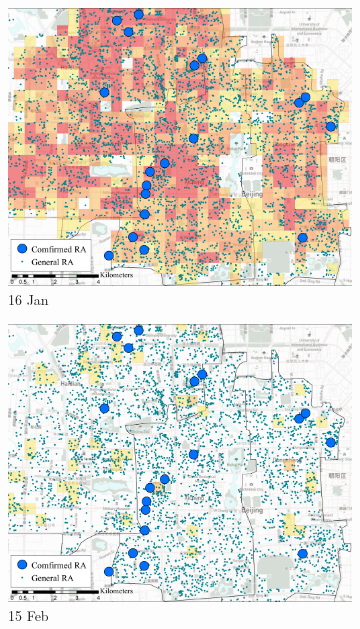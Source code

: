 \documentclass[preprints,ijgi,submit,moreauthors]{Definitions/mdpi}
\begin{document}
\begin{figure}[H]
    \centering
    \begin{subfigure}{.32\textwidth}
        \includegraphics[width=\textwidth]{Figures/Relation_with_POIs/POIsRAD2020_01_16.pdf}
        \caption{16 Jan}
    \end{subfigure}
    \begin{subfigure}{.32\textwidth}
        \includegraphics[width=\textwidth]{Figures/Relation_with_POIs/POIsRAD2020_02_15.pdf}
        \caption{15 Feb}
    \end{subfigure}
    \begin{subfigure}{.32\textwidth}

\end{subfigure}
\end{figure}
\end{document}

